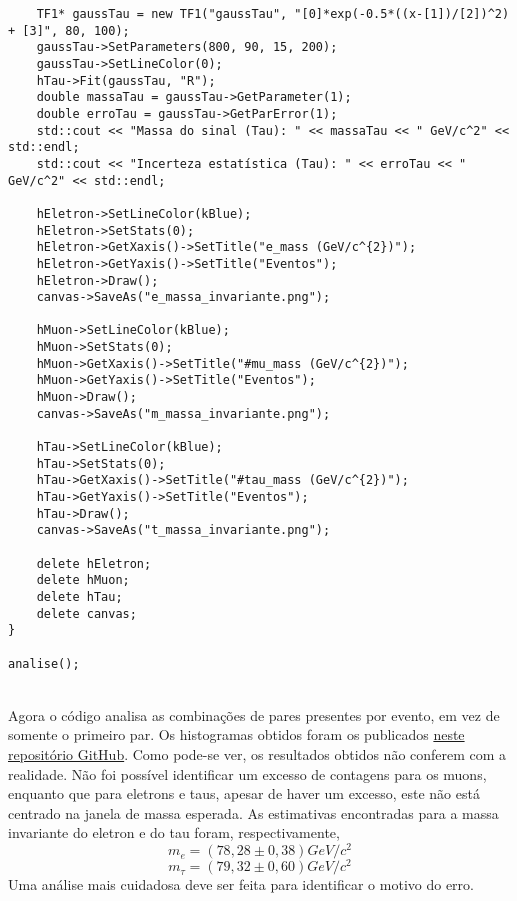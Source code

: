 \documentclass[a4 paper]{article}
\numberwithin{equation}{section}
\newcommand{\0}{\mathbf{0}}
\begin{document}
\begin{lstlisting}
    TF1* gaussTau = new TF1("gaussTau", "[0]*exp(-0.5*((x-[1])/[2])^2) + [3]", 80, 100);
    gaussTau->SetParameters(800, 90, 15, 200);
    gaussTau->SetLineColor(0);
    hTau->Fit(gaussTau, "R");
    double massaTau = gaussTau->GetParameter(1);
    double erroTau = gaussTau->GetParError(1);
    std::cout << "Massa do sinal (Tau): " << massaTau << " GeV/c^2" << std::endl;
    std::cout << "Incerteza estatística (Tau): " << erroTau << " GeV/c^2" << std::endl;

    hEletron->SetLineColor(kBlue);
    hEletron->SetStats(0);
    hEletron->GetXaxis()->SetTitle("e_mass (GeV/c^{2})");
    hEletron->GetYaxis()->SetTitle("Eventos");
    hEletron->Draw();
    canvas->SaveAs("e_massa_invariante.png");

    hMuon->SetLineColor(kBlue);
    hMuon->SetStats(0);
    hMuon->GetXaxis()->SetTitle("#mu_mass (GeV/c^{2})");
    hMuon->GetYaxis()->SetTitle("Eventos");
    hMuon->Draw();
    canvas->SaveAs("m_massa_invariante.png");

    hTau->SetLineColor(kBlue);
    hTau->SetStats(0);
    hTau->GetXaxis()->SetTitle("#tau_mass (GeV/c^{2})");
    hTau->GetYaxis()->SetTitle("Eventos");
    hTau->Draw();
    canvas->SaveAs("t_massa_invariante.png");

    delete hEletron;
    delete hMuon;
    delete hTau;
    delete canvas;
}

analise();

\end{lstlisting}
\\
Agora o código analisa as combinações de pares presentes por evento, em vez de somente o primeiro par. Os histogramas obtidos foram os publicados \href{https://github.com/DiogoCaffonso/FAE_Repo/tree/master/Trabalho6/exercicio/imagens}{neste repositório GitHub}. Como pode-se ver, os resultados obtidos não conferem com a realidade. Não foi possível identificar um excesso de contagens para os muons, enquanto que para eletrons e taus, apesar de haver um excesso, este não está centrado na janela de massa esperada. As estimativas encontradas para a massa invariante do eletron e do tau foram, respectivamente, $$m_{e}=(78,28\pm 0,38)GeV/c^{2}$$
$$m_{\tau}=(79,32\pm 0,60)GeV/c^{2}$$
Uma análise mais cuidadosa deve ser feita para identificar o motivo do erro.
\end{document}
